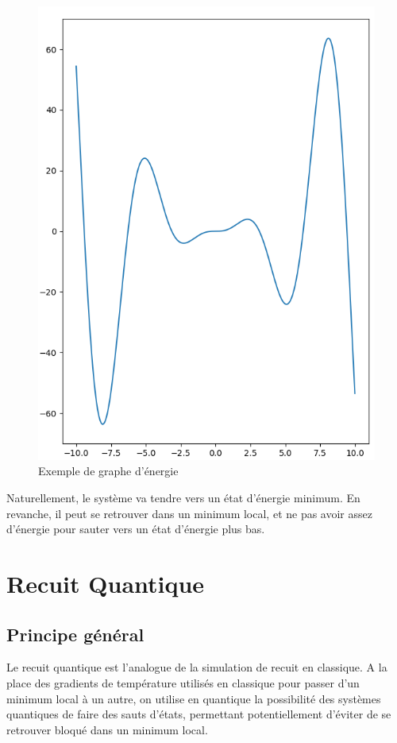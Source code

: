 \documentclass[12pt,a4paper]{article}
\begin{document}
\begin{figure}[H]
    \centering
    \includegraphics[scale=0.2]{ex_energy_graph.png}
    \caption{Exemple de graphe d'énergie}
    \label{fig:energyGraph}
\end{figure}


Naturellement, le système va tendre vers un état d'énergie minimum. En revanche, il peut se retrouver dans un minimum local, et ne pas avoir assez d'énergie pour sauter vers un état d'énergie plus bas.


\section{Recuit Quantique}
\subsection*{Principe général}
Le recuit quantique est l'analogue de la simulation de recuit en classique. A la place des gradients de température utilisés en classique pour passer d'un minimum local à un autre, on utilise en quantique la possibilité des systèmes quantiques de faire des sauts d'états, permettant potentiellement d'éviter de se retrouver bloqué dans un minimum local.
\end{document}
